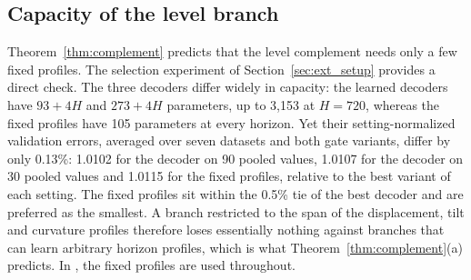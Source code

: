 {\subsection{Capacity of the level branch}
\label{sec:exp_capacity}

Theorem~\ref{thm:complement} predicts that the level complement needs only a few fixed profiles. The selection experiment of Section~\ref{sec:ext_setup} provides a direct check. The three decoders differ widely in capacity: the learned decoders have $93+4H$ and $273+4H$ parameters, up to 3{,}153 at $H=720$, whereas the fixed profiles have 105 parameters at every horizon. Yet their setting-normalized validation errors, averaged over seven datasets and both gate variants, differ by only 0.13\%: 1.0102 for the decoder on 90 pooled values, 1.0107 for the decoder on 30 pooled values and 1.0115 for the fixed profiles, relative to the best variant of each setting. The fixed profiles sit within the 0.5\% tie of the best decoder and are preferred as the smallest. A branch restricted to the span of the displacement, tilt and curvature profiles therefore loses essentially nothing against branches that can learn arbitrary horizon profiles, which is what Theorem~\ref{thm:complement}(a) predicts. In \sysLA, the fixed profiles are used throughout.
}
